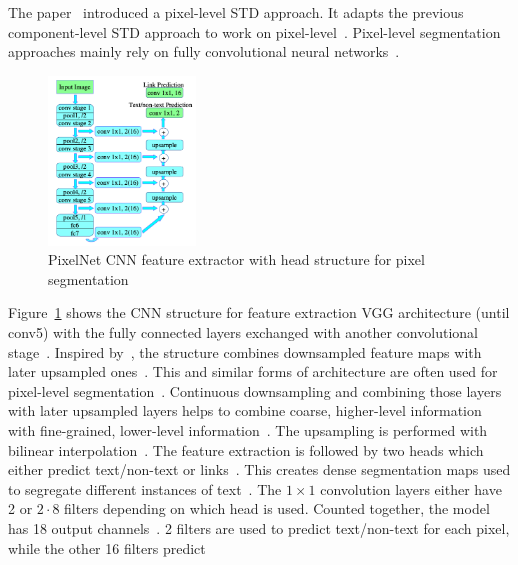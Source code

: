 The paper~\cite{deng_pixellink_2018} introduced a pixel-level \ac{STD} approach.
It adapts the previous component-level \ac{STD} approach to work on
pixel-level~\citep{deng_pixellink_2018}.
Pixel-level segmentation approaches mainly rely on fully convolutional neural
networks~\citep{dai_fused_2018}.
\begin{figure}[ht]
    \centering
    \includegraphics[width=0.35\textwidth]{img/STD-seg-based-CNN-Deng-PixelLink-2018.png}
    \caption[Feature extractor and prediction head for pixel segmentation]{%
        PixelNet CNN feature extractor with head structure for pixel
        segmentation~\citep{deng_pixellink_2018}\label{fig:STD-segbased-pixel-CNN}
    }
\end{figure}
Figure~\ref{fig:STD-segbased-pixel-CNN} shows the \ac{CNN} structure for feature extraction
VGG architecture (until conv5) with the fully connected layers exchanged with
another convolutional stage~\citep{deng_pixellink_2018}.
Inspired by~\cite{long_fully_2015}, the structure combines downsampled feature maps with later
upsampled ones~\citep{deng_pixellink_2018}.
This and similar forms of architecture are often used for pixel-level
segmentation~\citep{deng_pixellink_2018,yao_scene_2016,wu_self-organized_2017,
long_textsnake_2018,wang_shape_2019}.
Continuous downsampling and combining those layers with later upsampled layers helps
to combine coarse, higher-level information with fine-grained, lower-level
information~\citep{long_fully_2015}.
The upsampling is performed with bilinear interpolation~\citep{deng_pixellink_2018}.
The feature extraction is followed by two heads which either predict text/non-text or
links~\citep{deng_pixellink_2018}.
This creates dense segmentation maps used to segregate different instances of
text~\citep{deng_pixellink_2018}.
The $1\times1$ convolution layers either have 2 or $2\cdot8$ filters depending on which head is used.
Counted together, the model has 18 output channels~\citep{deng_pixellink_2018}.
2 filters are used to predict text/non-text for each pixel, while the other 16 filters predict
